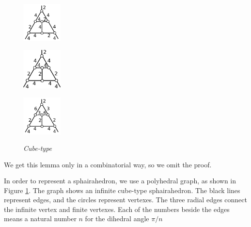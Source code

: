 \documentclass[suppldata, dvipdfmx]{interact}
\theoremstyle{plain}%
\theoremstyle{definition}
\theoremstyle{remark}
\theoremstyle{problemstyle}
\begin{document}
\begin{figure}[h!tbp]
\begin{minipage}[t]{0.75\textwidth}
\begin{minipage}[t]{0.15\textwidth}
   \subcaption{}
   \label{}
  \end{minipage}
 \hspace*{\fill}
  \begin{minipage}[t]{0.15\textwidth}
   \centering
   \includegraphics[width=0.8in, keepaspectratio]{./img/HexahedraWithSphericalFaces/cube/cube_i.png}
   \subcaption{}
   \label{fig:}
  \end{minipage}
 \hspace*{\fill}
  \begin{minipage}[t]{0.15\textwidth}
   \centering
   \includegraphics[width=0.8in, keepaspectratio]{./img/HexahedraWithSphericalFaces/cube/cube_j.png}
   \subcaption{}
   \label{fig:}
  \end{minipage}
 \hspace*{\fill}
  \begin{minipage}[t]{0.15\textwidth}
   \centering
   \includegraphics[width=0.8in, keepaspectratio]{./img/HexahedraWithSphericalFaces/cube/cube_k.png}
   \subcaption{}
   \label{fig:}
  \end{minipage}
 \hspace*{\fill}
  \caption{\textit{Cube-type}}
  \label{fig:cubeGraph}
 \end{minipage}
\end{figure}

We get this lemma only in a combinatorial way, so we omit the proof.

In order to represent a sphairahedron, we use a polyhedral graph, as
shown in Figure \ref{fig:cubeGraph}. The graph shows an infinite cube-type sphairahedron.
The black lines represent edges, and the circles represent
vertexes. The three radial edges connect the infinite vertex and finite
vertexes. Each of the numbers beside 
the edges means a natural number $n$ for the dihedral angle $\pi / n$
\end{document}
